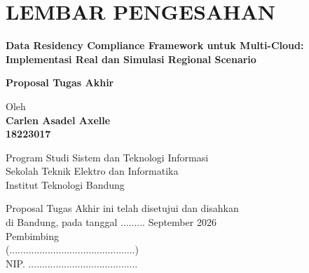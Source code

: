 \chapter*{LEMBAR PENGESAHAN}


\begin{center}
    \vspace{2cm}
  {\large\bfseries Data Residency Compliance Framework untuk Multi-Cloud: Implementasi Real dan Simulasi Regional Scenario}\\
     \vspace{2cm}

  {\Large \textbf{Proposal Tugas Akhir}}\\


  \vspace{1.5cm}
    
    
  {\large Oleh}\\[0.3cm]
    \textbf{
    {\large Carlen Asadel Axelle}\\
    {\large 18223017}
  }\\
    
  \vspace{0.5cm}
 
  {\large Program Studi Sistem dan Teknologi Informasi}\\
  {\large Sekolah Teknik Elektro dan Informatika}\\
  {\large Institut Teknologi Bandung}\\

  \vspace{1.5cm}

  Proposal Tugas Akhir ini telah disetujui dan disahkan\\ 
  di Bandung, pada tanggal ......... September 2026\\[1cm]

	Pembimbing  \\[3cm]
	(..............................................)   \\[0.2cm]
	NIP. ........................................ 

\end{center}

\vspace{1cm}
\noindent



